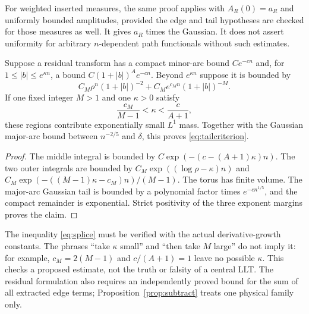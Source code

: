 For weighted inserted measures, the same proof applies with $A_R(0)=a_R$ and uniformly bounded amplitudes, provided the edge and tail hypotheses are checked for those measures as well. It gives $a_R$ times the Gaussian. It does not assert uniformity for arbitrary $n$-dependent path functionals without such estimates.

\begin{lemma}\label{lem:splice}
Suppose a residual transform has a compact minor-arc bound $Ce^{-cn}$ and, for $1\le|b|\le e^{\kappa n}$, a bound $C(1+|b|)^A e^{-cn}$. Beyond $e^{\kappa n}$ suppose it is bounded by
\[
 C_M\rho^n(1+|b|)^{-2}+C_Me^{c_M n}(1+|b|)^{-M}.
\]
If one fixed integer $M>1$ and one $\kappa>0$ satisfy
\begin{equation}\label{eq:splice}
       \frac{c_M}{M-1}<\kappa<\frac{c}{A+1},
\end{equation}
these regions contribute exponentially small $L^1$ mass. Together with the Gaussian major-arc bound between $n^{-2/5}$ and $\delta$, this proves \eqref{eq:tailcriterion}.
\end{lemma}
\begin{proof}
The middle integral is bounded by $C\exp(-(c-(A+1)\kappa)n)$. The two outer integrals are bounded by $C_M\exp((\log\rho-\kappa)n)$ and $C_M\exp(-( (M-1)\kappa-c_M)n)/(M-1)$. The torus has finite volume. The major-arc Gaussian tail is bounded by a polynomial factor times $e^{-c n^{1/5}}$, and the compact remainder is exponential. Strict positivity of the three exponent margins proves the claim.
\end{proof}
The inequality \eqref{eq:splice} must be verified with the actual derivative-growth constants. The phrases ``take $\kappa$ small'' and ``then take $M$ large'' do not imply it: for example, $c_M=2(M-1)$ and $c/(A+1)=1$ leave no possible $\kappa$. This checks a proposed estimate, not the truth or falsity of a central LLT. The residual formulation also requires an independently proved bound for the sum of all extracted edge terms; Proposition~\ref{prop:subtract} treats one physical family only.

